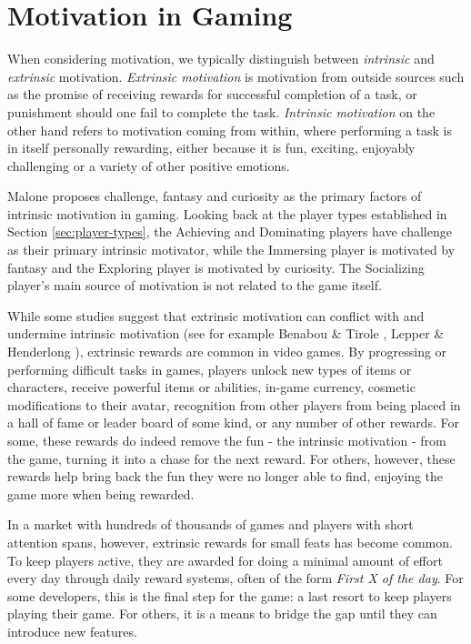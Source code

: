 \section{Motivation in Gaming}
\label{sec:motivation-in-gaming}

When considering motivation, we typically distinguish between \emph{intrinsic} and \emph{extrinsic} motivation. \emph{Extrinsic motivation} is motivation from outside sources such as the promise of receiving rewards for successful completion of a task, or punishment should one fail to complete the task. \emph{Intrinsic motivation} on the other hand refers to motivation coming from within, where performing a task is in itself personally rewarding, either because it is fun, exciting, enjoyably challenging or a variety of other positive emotions.

Malone \cite{malone1981toward} proposes challenge, fantasy and curiosity as the primary factors of intrinsic motivation in gaming. Looking back at the player types established in Section \ref{sec:player-types}, the Achieving and Dominating players have challenge as their primary intrinsic motivator, while the Immersing player is motivated by fantasy and the Exploring player is motivated by curiosity. The Socializing player's main source of motivation is not related to the game itself.

While some studies suggest that extrinsic motivation can conflict with and undermine intrinsic motivation (see for example Benabou \& Tirole \cite{benabou2003intrinsic}, Lepper \& Henderlong \cite{lepper2000motivation}), extrinsic rewards are common in video games. By progressing or performing difficult tasks in games, players unlock new types of items or characters, receive powerful items or abilities, in-game currency, cosmetic modifications to their avatar, recognition from other players from being placed in a hall of fame or leader board of some kind, or any number of other rewards. For some, these rewards do indeed remove the fun - the intrinsic motivation - from the game, turning it into a chase for the next reward. For others, however, these rewards help bring back the fun they were no longer able to find, enjoying the game more when being rewarded.

In a market with hundreds of thousands of games and players with short attention spans, however, extrinsic rewards for small feats has become common. To keep players active, they are awarded for doing a minimal amount of effort every day through daily reward systems, often of the form \emph{First X of the day}. For some developers, this is the final step for the game: a last resort to keep players playing their game. For others, it is a means to bridge the gap until they can introduce new features.

